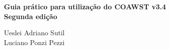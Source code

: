 \begingroup
\thispagestyle{empty}
\centering
\vspace*{7cm}
\par\normalfont\fontsize{30}{30}\sffamily\selectfont
\textbf{Guia prático para utilização do COAWST v3.4\\ \LARGE Segunda edição}\\
{\LARGE }\par %
\vspace*{1cm}
{\Huge Ueslei Adriano Sutil \\ Luciano Ponzi Pezzi}\par %
\endgroup
